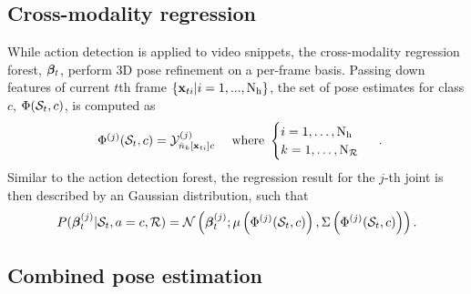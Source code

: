 \subsection{Cross-modality regression}

While action detection is applied to video snippets, the cross-modality regression forest, $\boldsymbol{\beta}_{t}$, perform 3D pose refinement on a per-frame basis. 
Passing down features of current $t$th frame $\{\mathbf{x}_{ti}|i = 1,...,\mathrm{N_{h}}\}$, the set of pose estimates for class $c$, $\Phi(\mathcal{S}_{t}, c)$, is computed as
\begin{equation}
	\label{eqn/body/regressset}
	\begin{array}{lr}
		\Phi^{(j)}(\mathcal{S}_{t}, c) = \mathcal{Y}^{(j)}_{{\hat{n}}_{k}[\mathbf{x}_{ti}]c}
		& \mbox{ where } 
		\begin{cases}
			i = 1,\dots,\mathrm{N_{h}} \\ 
			k = 1,\dots,\mathrm{N_{\mathcal{R}}}
		\end{cases}
	\end{array}.
\end{equation} 
Similar to the action detection forest, the regression result for the $j$-th joint is then described by an Gaussian distribution, such that 
\begin{equation}
	\label{eqn/body/regressiongaussian}
	P( \boldsymbol{\beta}_{t}^{(j)}| \mathcal{S}_{t}, a = c, \mathcal{R}) = \mathcal{N}\left(\boldsymbol{\beta}_{t}^{(j)};\mu\left(\Phi^{(j)}(\mathcal{S}_{t}, c)\right),\Sigma\left(\Phi^{(j)}(\mathcal{S}_{t},c)\right)\right). 
\end{equation}

\subsection{Combined pose estimation}

